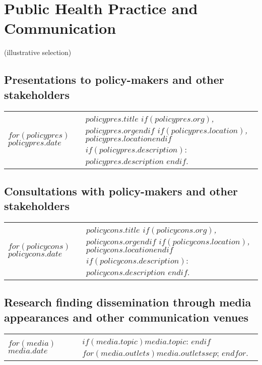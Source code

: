 \documentclass[martgin, line]{article}
\begin{document}

\section*{Public Health Practice and Communication}

(illustrative selection)

\subsection*{Presentations to policy-makers and other stakeholders}

\setlength{\extrarowheight}{.75em}
\begin{longtable}[l]{lp{5in}}   
$for(policypres)$
$policypres.date$&
\parbox[t]{5in}{
  $policypres.title$%
  \textit{$if(policypres.org)$, $policypres.org$$endif$%
    $if(policypres.location)$, $policypres.location$$endif$}%
    $if(policypres.description)$: %
    $policypres.description$%
    $endif$.%
  }\\
$endfor$
\end{longtable}
\setlength{\extrarowheight}{0em}

\subsection*{Consultations with policy-makers and other
  stakeholders}

\setlength{\extrarowheight}{.75em}
\begin{longtable}[l]{lp{5in}}   
$for(policycons)$
$policycons.date$&
\parbox[t]{5in}{
    \textit{$policycons.title$%
    $if(policycons.org)$, $policycons.org$$endif$%
    $if(policycons.location)$, $policycons.location$$endif$}%
    $if(policycons.description)$: %
    $policycons.description$%
    $endif$.%
  }\\
$endfor$
\end{longtable}
\setlength{\extrarowheight}{0em}

\subsection*{Research finding dissemination through media appearances
  and other communication venues}


\setlength{\extrarowheight}{.75em}
\begin{longtable}[l]{lp{5in}}   
$for(media)$
$media.date$&
\parbox[t]{5in}{
    $if(media.topic)$$media.topic$: $endif$%
    $for(media.outlets)$$media.outlets$$sep$; $endfor$.%
  }\\
$endfor$
\end{longtable}
\setlength{\extrarowheight}{0em}
\end{document}
